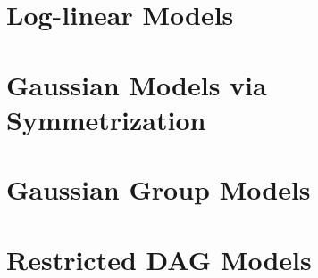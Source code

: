 \documentclass[12pt,a4paper]{book}
\newcommand{\Mcal}{\mathcal{M}}
\newcommand{\Mg}{\mathcal{M}^{\mathtt{g}}}
\theoremstyle{theorem}
\theoremstyle{definition}
\theoremstyle{remark}
\begin{document}


\chapter{Log-linear Models}\label{ch:LogLinearModels}



\chapter{Gaussian Models via Symmetrization}\label{ch:GaussianModels}




\chapter{Gaussian Group Models}\label{ch:GaussianGroupModels}






\chapter{Restricted DAG Models}\label{ch:RDAGs}
\end{document}
